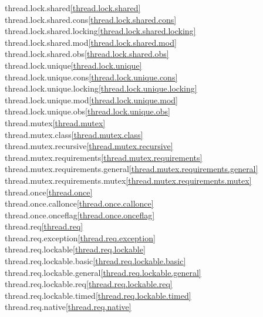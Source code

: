 \begin{multicols}{2}
thread.lock.shared\quad\ref{thread.lock.shared}\\
thread.lock.shared.cons\quad\ref{thread.lock.shared.cons}\\
thread.lock.shared.locking\quad\ref{thread.lock.shared.locking}\\
thread.lock.shared.mod\quad\ref{thread.lock.shared.mod}\\
thread.lock.shared.obs\quad\ref{thread.lock.shared.obs}\\
thread.lock.unique\quad\ref{thread.lock.unique}\\
thread.lock.unique.cons\quad\ref{thread.lock.unique.cons}\\
thread.lock.unique.locking\quad\ref{thread.lock.unique.locking}\\
thread.lock.unique.mod\quad\ref{thread.lock.unique.mod}\\
thread.lock.unique.obs\quad\ref{thread.lock.unique.obs}\\
thread.mutex\quad\ref{thread.mutex}\\
thread.mutex.class\quad\ref{thread.mutex.class}\\
thread.mutex.recursive\quad\ref{thread.mutex.recursive}\\
thread.mutex.requirements\quad\ref{thread.mutex.requirements}\\
thread.mutex.requirements.general\quad\ref{thread.mutex.requirements.general}\\
thread.mutex.requirements.mutex\quad\ref{thread.mutex.requirements.mutex}\\
thread.once\quad\ref{thread.once}\\
thread.once.callonce\quad\ref{thread.once.callonce}\\
thread.once.onceflag\quad\ref{thread.once.onceflag}\\
thread.req\quad\ref{thread.req}\\
thread.req.exception\quad\ref{thread.req.exception}\\
thread.req.lockable\quad\ref{thread.req.lockable}\\
thread.req.lockable.basic\quad\ref{thread.req.lockable.basic}\\
thread.req.lockable.general\quad\ref{thread.req.lockable.general}\\
thread.req.lockable.req\quad\ref{thread.req.lockable.req}\\
thread.req.lockable.timed\quad\ref{thread.req.lockable.timed}\\
thread.req.native\quad\ref{thread.req.native}\\

\end{multicols}

